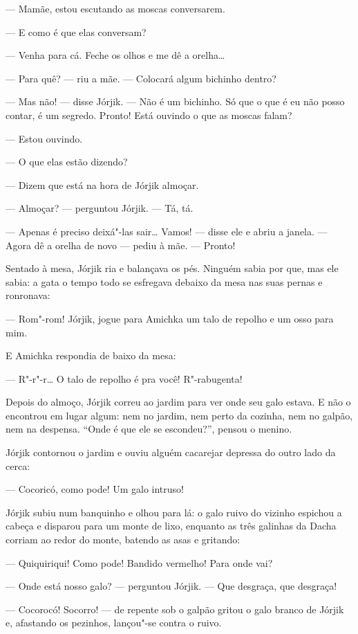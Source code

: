 --- Mamãe, estou escutando as moscas conversarem.

--- E como é que elas conversam?

--- Venha para cá. Feche os olhos e me dê a orelha\ldots{}

--- Para quê? --- riu a mãe. --- Colocará algum bichinho dentro?

--- Mas não! --- disse Jórjik. --- Não é um bichinho. Só que o que é eu
não posso contar, é um segredo. Pronto! Está ouvindo o que as moscas
falam?

--- Estou ouvindo.

--- O que elas estão dizendo?

--- Dizem que está na hora de Jórjik almoçar.

--- Almoçar? --- perguntou Jórjik. --- Tá, tá.

--- Apenas é preciso deixá"-las sair\ldots{} Vamos! --- disse ele e abriu a
janela. --- Agora dê a orelha de novo --- pediu à mãe. --- Pronto!

Sentado à mesa, Jórjik ria e balançava os pés. Ninguém sabia por que,
mas ele sabia: a gata o tempo todo se esfregava debaixo da mesa nas suas
pernas e ronronava:

--- Rom"-rom! Jórjik, jogue para Amichka um talo de repolho e um osso
para mim.

E Amichka respondia de baixo da mesa:

--- R"-r"-r\ldots{} O talo de repolho é pra você! R"-rabugenta!

Depois do almoço, Jórjik correu ao jardim para ver onde seu galo estava.
E não o encontrou em lugar algum: nem no jardim, nem perto da cozinha,
nem no galpão, nem na despensa. ``Onde é que ele se escondeu?'', pensou
o menino.

Jórjik contornou o jardim e ouviu alguém cacarejar depressa do outro
lado da cerca:

--- Cocoricó, como pode! Um galo intruso!

Jórjik subiu num banquinho e olhou para lá: o galo ruivo do vizinho
espichou a cabeça e disparou para um monte de lixo, enquanto as três
galinhas da Dacha corriam ao redor do monte, batendo as asas e gritando:

--- Quiquiriqui! Como pode! Bandido vermelho! Para onde vai?

--- Onde está nosso galo? --- perguntou Jórjik. --- Que desgraça, que
desgraça!

--- Cocorocó! Socorro! --- de repente sob o galpão gritou o galo branco
de Jórjik e, afastando os pezinhos, lançou"-se contra o ruivo.


